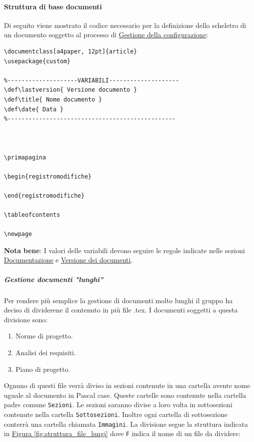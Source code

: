 \paragraph{Struttura di base documenti}
\label{par:struttura_di_base_documenti}
Di seguito viene mostrato il codice necessario per la definizione dello scheletro di un documento soggetto al processo di \hyperref[subsec:gestione_della_configurazione]{Gestione della configurazione}:

\begin{lstlisting}
\documentclass[a4paper, 12pt]{article}
\usepackage{custom}

%--------------------VARIABILI--------------------
\def\lastversion{ Versione documento }
\def\title{ Nome documento }
\def\date{ Data }
%------------------------------------------------



\primapagina

\begin{registromodifiche}

\end{registromodifiche}

\tableofcontents

\newpage

\end{lstlisting}
\textbf{Nota bene}: I valori delle variabili devono seguire le regole indicate nelle sezioni \hyperref[subsec:documentazione]{Documentazione} e \hyperref[par:versione_documenti]{Versione dei documenti}.

\subparagraph{Gestione documenti "lunghi"}
Per rendere più semplice la gestione di documenti molto lunghi il gruppo ha deciso di dividerene il contenuto in più file .tex.
I documenti soggetti a questa divisione sono:
\begin{enumerate}
    \item Norme di progetto.
    \item Analisi dei requisiti.
    \item Piano di progetto.
\end{enumerate}
Ognuno di questi file verrà diviso in sezioni contenute in una cartella avente nome uguale al documento in Pascal case.
Queste cartelle sono contenute nella cartella padre comune \texttt{Sezioni}.
Le sezioni saranno divise a loro volta in sottosezioni contenute nella cartella \texttt{Sottosezioni}.
Inoltre ogni cartella di sottosezione conterrà una cartella chiamata \texttt{Immagini}.
La divisione segue la struttura indicata in \hyperref[fig:struttura_file_lungi]{Figura \ref{fig:struttura_file_lungi}} dove \texttt{F} indica il nome di un file da dividere:

